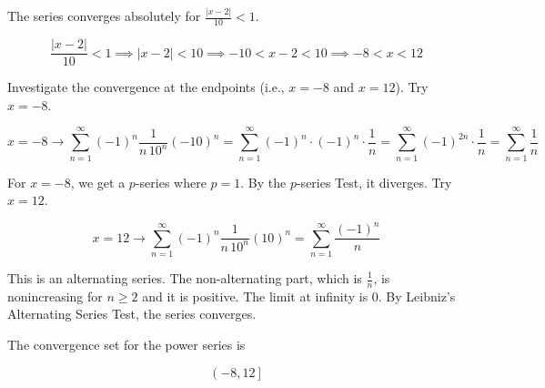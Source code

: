 \documentclass{article}
\begin{document}
\noindent The series converges absolutely for $\displaystyle \frac{|x-2|}{10}<1$.

\[\frac{|x-2|}{10}<1\implies|x-2|<10\implies-10<x-2<10\implies -8<x<12\]

\hfill

\noindent Investigate the convergence at the endpoints (i.e., $x=-8$ and $x=12$). Try $x=-8$.

\[x=-8\rightarrow\sum_{n=1}^{\infty}(-1)^n\frac1{n\,10^n}(-10)^n=\sum_{n=1}^{\infty}(-1)^n\cdot(-1)^n\cdot\frac1{n}=\sum_{n=1}^{\infty}(-1)^{2n}\cdot\frac1n=\sum_{n=1}^{\infty}\frac1n\]

\hfill

\noindent For $x=-8$, we get a $p$-series where $p=1$. By the $p$-series Test, it diverges. Try $x=12$.

\[x=12\rightarrow\sum_{n=1}^{\infty}(-1)^n\frac1{n\,10^n}(10)^n=\sum_{n=1}^{\infty}\frac{(-1)^n}n\]

\hfill

\noindent This is an alternating series. The non-alternating part, which is $\frac1n$, is nonincreasing for $n\geq2$ and it is positive. The limit at infinity is $0$. By Leibniz's Alternating Series Test, the series converges.

\hfill

\noindent The convergence set for the power series is

\[\boxed{\left(-8,12\right]}\]
\end{document}

